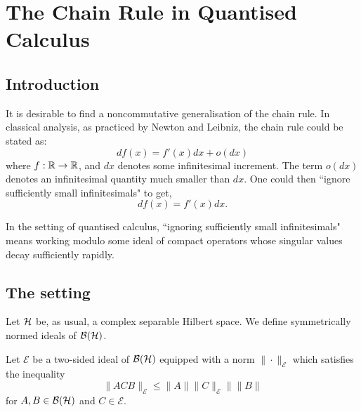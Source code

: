 
\chapter{The Chain Rule in Quantised Calculus} %

\label{TheChainRule} %



\section{Introduction}

 It is desirable
to find a noncommutative generalisation of the chain rule. In classical analysis,
as practiced by Newton and Leibniz, the chain rule could be stated as:
\begin{equation}
\label{classicalChainRule}
    df(x) = f'(x)dx+o(dx)
\end{equation}
where $f:\mathbb{R}\to\mathbb{R}$, and $dx$ denotes some infinitesimal increment.
The term $o(dx)$ denotes an infinitesimal quantity much smaller than $dx$. 
One could then ``ignore sufficiently small infinitesimals" to get,
\begin{equation}
    df(x) = f'(x)dx.
\end{equation}  

In the setting of quantised calculus, ``ignoring sufficiently small infinitesimals"
means working modulo some ideal of compact operators whose singular values
decay sufficiently rapidly.


\section{The setting}
Let $\mathcal{H}$ be, as usual, a complex separable Hilbert space. We
define symmetrically normed ideals of $\mathcal{B}(\mathcal{H})$.
\begin{definition}
    Let $\mathcal{E}$ be a two-sided ideal of $\mathcal{B}(\mathcal{H})$
    equipped with a norm $\|\cdot\|_{\mathcal{E}}$ which satisfies the inequality
    \begin{equation}
        \|ACB\|_{\mathcal{E}} \leq \|A\|\|C\|_\mathcal{E}\|\|B\|
    \end{equation}
    for $A,B \in \mathcal{B}(\mathcal{H})$ and $C \in \mathcal{E}$.
\end{definition}


